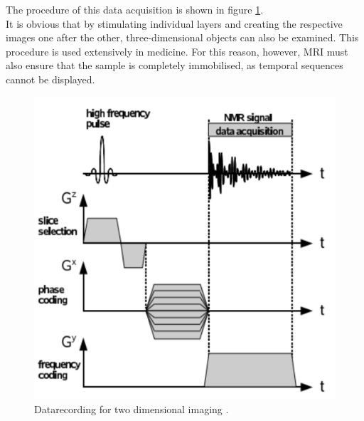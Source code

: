 The procedure of this data acquisition is shown in figure \ref{fig:signal}.\\
It is obvious that by stimulating individual layers and creating the respective images one after the other, three-dimensional objects can also be examined.
This procedure is used extensively in medicine.
For this reason, however, MRI must also ensure that the sample is completely immobilised, as temporal sequences cannot be displayed.
\begin{figure}[ht]
\centering
\includegraphics[scale=.25]{images//signal.png}
\caption{Datarecording for two dimensional imaging \cite{script_nmr}.}
\label{fig:signal}
\end{figure}